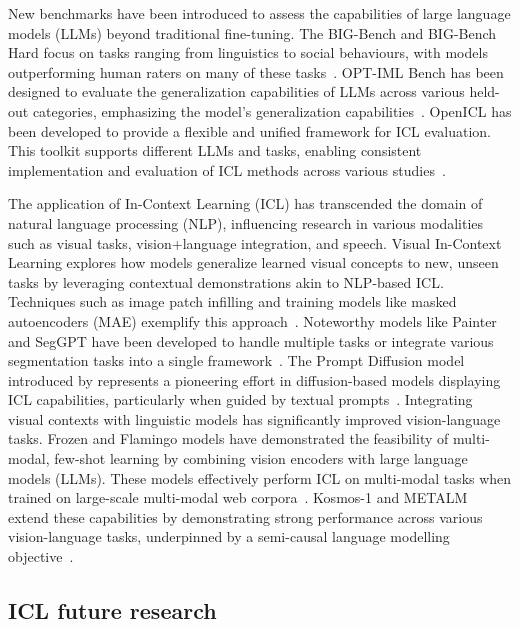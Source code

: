 New benchmarks have been introduced to assess the capabilities of large language models (LLMs) beyond traditional fine-tuning.
The BIG-Bench and BIG-Bench Hard focus on tasks ranging from linguistics to social behaviours, with models outperforming human raters on many of these tasks~\cite{srivastava2023imitation, suzgun2022challenging}.
OPT-IML Bench has been designed to evaluate the generalization capabilities of LLMs across various held-out categories, emphasizing the model's generalization capabilities~\cite{iyer2022opt}.
OpenICL has been developed to provide a flexible and unified framework for ICL evaluation.
This toolkit supports different LLMs and tasks, enabling consistent implementation and evaluation of ICL methods across various studies~\cite{wu2023openicl}.

The application of In-Context Learning (ICL) has transcended the domain of natural language processing (NLP), influencing research in various modalities such as visual tasks, vision+language integration, and speech.
Visual In-Context Learning explores how models generalize learned visual concepts to new, unseen tasks by leveraging contextual demonstrations akin to NLP-based ICL. Techniques such as image patch infilling and training models like masked autoencoders (MAE) exemplify this approach~\cite{bar2022visual}.
Noteworthy models like Painter and SegGPT have been developed to handle multiple tasks or integrate various segmentation tasks into a single framework~\cite{wang2023images, wang2023seggpt}.
The Prompt Diffusion model introduced by \textcite{wang2023incontext} represents a pioneering effort in diffusion-based models displaying ICL capabilities, particularly when guided by textual prompts~\cite{wang2023incontext}.
Integrating visual contexts with linguistic models has significantly improved vision-language tasks.
Frozen and Flamingo models have demonstrated the feasibility of multi-modal, few-shot learning by combining vision encoders with large language models (LLMs).
These models effectively perform ICL on multi-modal tasks when trained on large-scale multi-modal web corpora~\cite{tsimpoukelli2021frozen, alayrac2022flamingo}.
Kosmos-1 and METALM extend these capabilities by demonstrating strong performance across various vision-language tasks, underpinned by a semi-causal language modelling objective~\cite{huang2023language, hao2022language}.

\subsection{ICL future research}
\label{subsec:icl-future}

